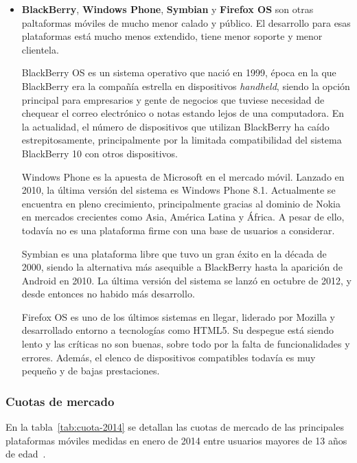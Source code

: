 \begin{itemize}
\item \textbf{BlackBerry}, \textbf{Windows Phone}, \textbf{Symbian} y
  \textbf{Firefox OS} son otras paltaformas móviles de mucho menor calado y
  público. El desarrollo para esas plataformas está mucho menos extendido, tiene
  menor soporte y menor clientela.

  BlackBerry OS es un sistema operativo que nació en 1999, época en la que
  BlackBerry era la compañía estrella en dispositivos \textit{handheld}, siendo
  la opción principal para empresarios y gente de negocios que tuviese necesidad
  de chequear el correo electrónico o notas estando lejos de una computadora. En
  la actualidad, el número de dispositivos que utilizan BlackBerry ha caído
  estrepitosamente, principalmente por la limitada compatibilidad del sistema
  BlackBerry 10 con otros dispositivos.

  Windows Phone es la apuesta de Microsoft en el mercado móvil. Lanzado en 2010,
  la última versión del sistema es Windows Phone 8.1. Actualmente se encuentra
  en pleno crecimiento, principalmente gracias al dominio de Nokia en mercados
  crecientes como Asia, América Latina y África\cite{wp-beats-ios}. A pesar de
  ello, todavía no es una plataforma firme con una base de usuarios a considerar.

  Symbian es una plataforma libre que tuvo un gran éxito en la década de 2000,
  siendo la alternativa más asequible a BlackBerry hasta la aparición de Android
  en 2010. La última versión del sistema se lanzó en octubre de 2012, y desde
  entonces no habido más desarrollo.

  Firefox OS es uno de los últimos sistemas en llegar, liderado por Mozilla y
  desarrollado entorno a tecnologías como HTML5. Su despegue está siendo lento y
  las críticas no son buenas, sobre todo por la falta de funcionalidades y
  errores. Además, el elenco de dispositivos compatibles todavía es muy pequeño
  y de bajas prestaciones. 

\end{itemize}

\subsubsection{Cuotas de mercado}

En la tabla~\ref{tab:cuota-2014} se detallan las cuotas de mercado de las
principales plataformas móviles medidas en enero de 2014 entre usuarios mayores
de 13 años de edad~\cite{comscore-report-2014}.

